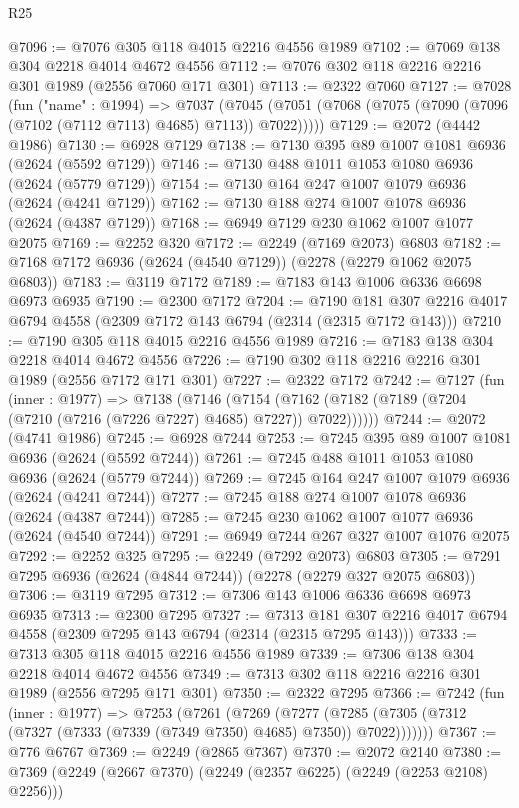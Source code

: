 \begin{lexlean}{R25}
\begin{coremodule}
@7096 := @7076 @305 @118 @4015 @2216 @4556 @1989
@7102 := @7069 @138 @304 @2218 @4014 @4672 @4556
@7112 := @7076 @302 @118 @2216 @2216 @301 @1989 (@2556 @7060 @171 @301)
@7113 := @2322 @7060
@7127 := @7028
    (fun ("name" : @1994) =>
    @7037 (@7045 (@7051 (@7068 (@7075 (@7090 (@7096 (@7102 (@7112 @7113) @4685) @7113)) @7022)))))
@7129 := @2072 (@4442 @1986)
@7130 := @6928 @7129
@7138 := @7130 @395 @89 @1007 @1081 @6936 (@2624 (@5592 @7129))
@7146 := @7130 @488 @1011 @1053 @1080 @6936 (@2624 (@5779 @7129))
@7154 := @7130 @164 @247 @1007 @1079 @6936 (@2624 (@4241 @7129))
@7162 := @7130 @188 @274 @1007 @1078 @6936 (@2624 (@4387 @7129))
@7168 := @6949 @7129 @230 @1062 @1007 @1077 @2075
@7169 := @2252 @320
@7172 := @2249 (@7169 @2073) @6803
@7182 := @7168 @7172 @6936 (@2624 (@4540 @7129)) (@2278 (@2279 @1062 @2075 @6803))
@7183 := @3119 @7172
@7189 := @7183 @143 @1006 @6336 @6698 @6973 @6935
@7190 := @2300 @7172
@7204 := @7190 @181 @307 @2216 @4017 @6794 @4558 (@2309 @7172 @143 @6794 (@2314 (@2315 @7172 @143)))
@7210 := @7190 @305 @118 @4015 @2216 @4556 @1989
@7216 := @7183 @138 @304 @2218 @4014 @4672 @4556
@7226 := @7190 @302 @118 @2216 @2216 @301 @1989 (@2556 @7172 @171 @301)
@7227 := @2322 @7172
@7242 := @7127
    (fun (inner : @1977) =>
    @7138
      (@7146
        (@7154 (@7162 (@7182 (@7189 (@7204 (@7210 (@7216 (@7226 @7227) @4685) @7227)) @7022))))))
@7244 := @2072 (@4741 @1986)
@7245 := @6928 @7244
@7253 := @7245 @395 @89 @1007 @1081 @6936 (@2624 (@5592 @7244))
@7261 := @7245 @488 @1011 @1053 @1080 @6936 (@2624 (@5779 @7244))
@7269 := @7245 @164 @247 @1007 @1079 @6936 (@2624 (@4241 @7244))
@7277 := @7245 @188 @274 @1007 @1078 @6936 (@2624 (@4387 @7244))
@7285 := @7245 @230 @1062 @1007 @1077 @6936 (@2624 (@4540 @7244))
@7291 := @6949 @7244 @267 @327 @1007 @1076 @2075
@7292 := @2252 @325
@7295 := @2249 (@7292 @2073) @6803
@7305 := @7291 @7295 @6936 (@2624 (@4844 @7244)) (@2278 (@2279 @327 @2075 @6803))
@7306 := @3119 @7295
@7312 := @7306 @143 @1006 @6336 @6698 @6973 @6935
@7313 := @2300 @7295
@7327 := @7313 @181 @307 @2216 @4017 @6794 @4558 (@2309 @7295 @143 @6794 (@2314 (@2315 @7295 @143)))
@7333 := @7313 @305 @118 @4015 @2216 @4556 @1989
@7339 := @7306 @138 @304 @2218 @4014 @4672 @4556
@7349 := @7313 @302 @118 @2216 @2216 @301 @1989 (@2556 @7295 @171 @301)
@7350 := @2322 @7295
@7366 := @7242
    (fun (inner : @1977) =>
    @7253
      (@7261
        (@7269
          (@7277 (@7285 (@7305 (@7312 (@7327 (@7333 (@7339 (@7349 @7350) @4685) @7350)) @7022)))))))
@7367 := @776 @6767
@7369 := @2249 (@2865 @7367)
@7370 := @2072 @2140
@7380 := @7369 (@2249 (@2667 @7370) (@2249 (@2357 @6225) (@2249 (@2253 @2108) @2256)))

\end{coremodule}
\end{lexlean}
